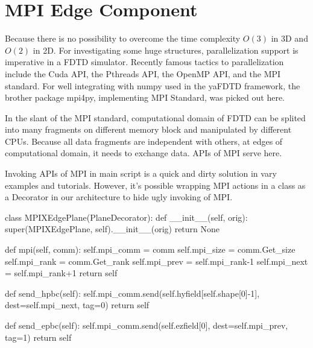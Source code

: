\section{MPI Edge Component}
Because there is no possibility to overcome the time complexity $O(3)$ in 3D and $O(2)$ in 2D. For investigating some
huge structures, parallelization support is imperative in a FDTD simulator. Recently famous tactics to parallelization
include the Cuda API, the Pthreads API, the OpenMP API, and the MPI standard. For well integrating with numpy used in
the yaFDTD framework, the brother package mpi4py, implementing MPI Standard, was picked out here.

In the slant of the MPI standard, computational domain of FDTD can be splited into many fragments on different memory
block and manipulated by different CPUs. Because all data fragments are independent with others, at edges of
computational domain, it needs to exchange data. APIs of MPI serve here.

Invoking APIs of MPI in main script is a quick and dirty solution in vary examples and tutorials. However, it's possible
wrapping MPI actions in a class as a Decorator in our architecture to hide ugly invoking of MPI. 
\begin{code}
    class MPIXEdgePlane(PlaneDecorator):
        def __init__(self, orig):
            super(MPIXEdgePlane, self).__init__(orig)
            return None

        def mpi(self, comm):
            self.mpi_comm = comm
            self.mpi_size = comm.Get_size
            self.mpi_rank = comm.Get_rank
            self.mpi_prev = self.mpi_rank-1
            self.mpi_next = self.mpi_rank+1
            return self

        def send_hpbc(self):
            self.mpi_comm.send(self.hyfield[self.shape[0]-1], dest=self.mpi_next, tag=0)
            return self

        def send_epbc(self):
            self.mpi_comm.send(self.ezfield[0], dest=self.mpi_prev, tag=1)
            return self
\end{code}
